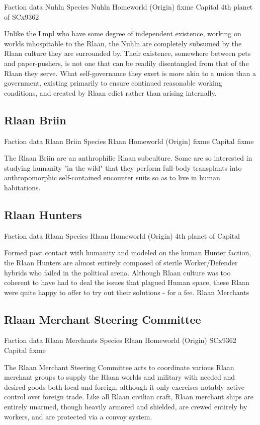 Faction data 
Nuhln 
Species 	Nuhln 
Homeworld (Origin) 	fixme 
Capital 	4th planet of SCx9362 

Unlike the Lmpl who have some degree of independent existence, working
on worlds inhospitable to the Rlaan, the Nuhln are completely subsumed
by the Rlaan culture they are surrounded by. Their existence,
somewhere between pets and paper-pushers, is not one that can be
readily disentangled from that of the Rlaan they serve. What
self-governance they exert is more akin to a union than a government,
existing primarily to ensure continued reasonable working conditions,
and created by Rlaan edict rather than arising internally.
 
\subsection{Rlaan Briin}

Faction data 
Rlaan Briin 
Species 	Rlaan
Homeworld (Origin) 	fixme 
Capital 	fixme 

The Rlaan Briin are an anthrophilic Rlaan subculture. Some are so
interested in studying humanity "in the wild" that they perform
full-body transplants into anthropomorphic self-contained encounter
suits so as to live in human habitations.
 
\subsection{Rlaan Hunters}

Faction data 
Rlaan 
Species 	Rlaan 
Homeworld (Origin) 	4th planet of 
Capital 	

Formed post contact with humanity and modeled on the human Hunter
faction, the Rlaan Hunters are almost entirely composed of sterile
Worker/Defender hybrids who failed in the political arena. Although
Rlaan culture was too coherent to have had to deal the issues that
plagued Human space, these Rlaan were quite happy to offer to try out
their solutions - for a fee.  Rlaan Merchants

\subsection{Rlaan Merchant Steering Committee}
Faction data 
Rlaan Merchants 
Species 	Rlaan 
Homeworld (Origin) 	SCx9362 
Capital 	fixme 

The Rlaan Merchant Steering Committee acts to coordinate various Rlaan
merchant groups to supply the Rlaan worlds and military with needed
and desired goods both local and foreign, although it only exercises
notably active control over foreign trade. Like all Rlaan civilian
craft, Rlaan merchant ships are entirely unarmed, though heavily
armored and shielded, are crewed entirely by workers, and are
protected via a convoy system.
 
